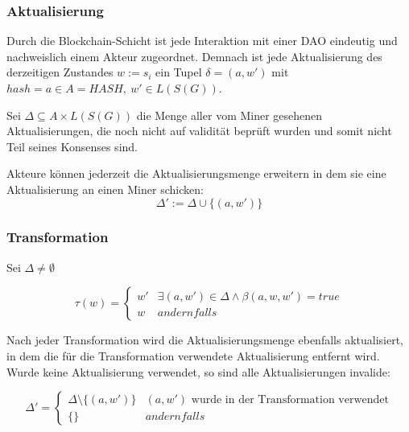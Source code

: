 \documentclass[a4paper,12pt]{article}
\begin{document}
% 
% 
% 
% 
% 

\subsubsection*{Aktualisierung}
Durch die Blockchain-Schicht ist jede Interaktion mit einer DAO eindeutig und nachweislich einem Akteur zugeordnet. Demnach ist jede Aktualisierung des derzeitigen Zustandes $w := s_i$ ein Tupel $\delta = (a,w')$ mit $hash=a\in A=HASH,\ w'\in L(S(G))$.

Sei $\Delta \subseteq A\times L(S(G))$ die Menge aller vom Miner gesehenen Aktualisierungen, die noch nicht auf validität beprüft wurden und somit nicht Teil seines Konsenses sind.


Akteure können jederzeit die Aktualisierungsmenge erweitern in dem sie eine Aktualisierung an einen Miner schicken: 
\[ \Delta' := \Delta \cup \{(a,w')\} \] 


\subsubsection*{Transformation}
Sei $\Delta \neq \emptyset$ 

\[
  \tau( w ) = 
  \begin{cases}
    w'  & \exists (a,w') \in \Delta \land \beta(a,w,w') = true \\
    w   & andernfalls 
  \end{cases}
\] 

Nach jeder Transformation wird die Aktualisierungsmenge ebenfalls aktualisiert, in dem die für die Transformation verwendete Aktualisierung entfernt wird. Wurde keine Aktualisierung verwendet, so sind alle Aktualisierungen invalide:

\[ 
  \Delta' = 
  \begin{cases}
    \Delta\setminus \{ (a, w' )\} & (a,w')\text{ wurde in der Transformation verwendet} \\
    \{\} & andernfalls
  \end{cases}
\] 
\end{document}
